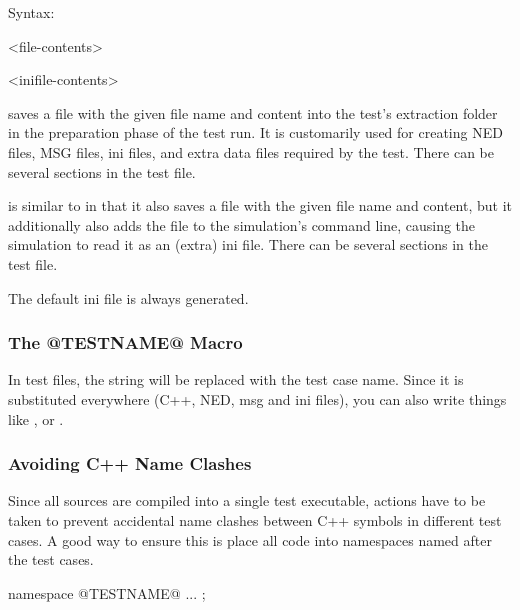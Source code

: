 Syntax:

\begin{filelisting}
<file-contents>
\end{filelisting}

\begin{filelisting}
<inifile-contents>
\end{filelisting}

 saves a file with the given file name and content into the test's
extraction folder in the preparation phase of the test run. It is customarily
used for creating NED files, MSG files, ini files, and extra data files
required by the test. There can be several  sections in the test file.

 is similar to  in that it also saves a file with the
given file name and content, but it additionally also adds the file to the simulation's
command line, causing the simulation to read it as an (extra) ini file.
There can be several  sections in the test file.

The default ini file is always generated.


\subsubsection{The @TESTNAME@ Macro}
\label{sec:testing:opptest:testname-macro}

In test files, the string  will be replaced with the test
case name. Since it is substituted everywhere (C++, NED, msg and ini
files), you can also write things like , or
.

\subsubsection{Avoiding C++ Name Clashes}
\label{sec:testing:opptest:avoiding-cpp-name-clashes}

Since all sources are compiled into a single test executable, actions have
to be taken to prevent accidental name clashes between C++ symbols in
different test cases. A good way to ensure this is place all code into
namespaces named after the test cases.

\begin{filelisting}
namespace @TESTNAME@ {
   ...
};
\end{filelisting}

